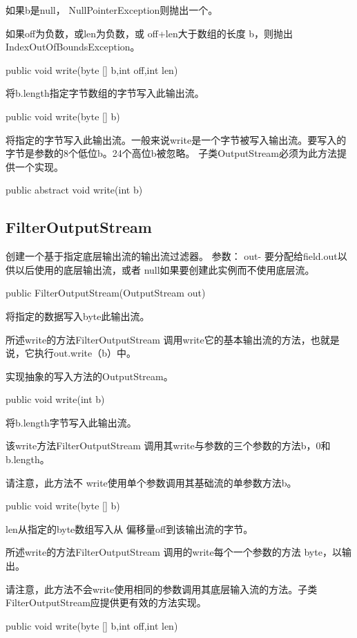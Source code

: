 如果b是null， NullPointerException则抛出一个。

如果off为负数，或len为负数，或 off+len大于数组的长度 b，则抛出IndexOutOfBoundsException。
\begin{java}
public void write(byte [] b,int off,int len)
\end{java}
将b.length指定字节数组的字节写入此输出流。
\begin{java}
public void write(byte [] b)
\end{java}
将指定的字节写入此输出流。一般来说write是一个字节被写入输出流。要写入的字节是参数的8个低位b。24个高位b被忽略。
子类OutputStream必须为此方法提供一个实现。
\begin{java}
public abstract void write(int b)
\end{java}

\subsection{FilterOutputStream}


创建一个基于指定底层输出流的输出流过滤器。
参数：
out- 要分配给field.out以供以后使用的底层输出流，或者 null如果要创建此实例而不使用底层流。
\begin{java}
public FilterOutputStream(OutputStream  out)
\end{java}
将指定的数据写入byte此输出流。

所述write的方法FilterOutputStream 调用write它的基本输出流的方法，也就是说，它执行out.write（b）中。

实现抽象的写入方法的OutputStream。

\begin{java}
public void write(int b)
\end{java}
将b.length字节写入此输出流。

该write方法FilterOutputStream 调用其write与参数的三个参数的方法b，0和 b.length。

请注意，此方法不 write使用单个参数调用其基础流的单参数方法b。
\begin{java}
public void write(byte [] b)
\end{java}
len从指定的byte数组写入从 偏移量off到该输出流的字节。

所述write的方法FilterOutputStream 调用的write每个一个参数的方法 byte，以输出。

请注意，此方法不会write使用相同的参数调用其底层输入流的方法。子类FilterOutputStream应提供更有效的方法实现。

\begin{java}
public void write(byte [] b,int off,int len)
\end{java}

